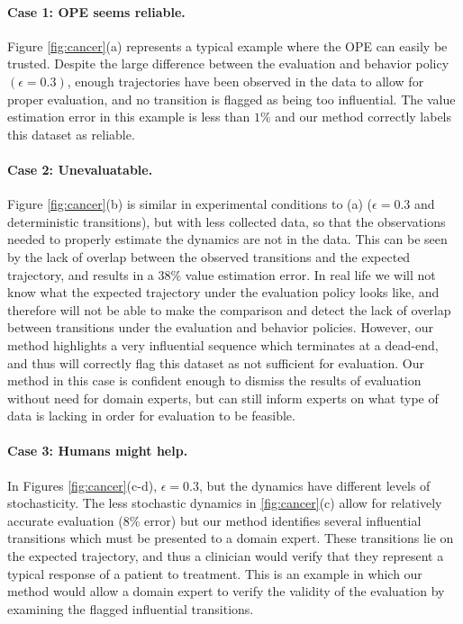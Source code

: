 \documentclass{article}
\begin{document}
\paragraph{Case 1: OPE seems reliable.}
Figure \ref{fig:cancer}(a) represents a typical example where the OPE can easily be trusted. Despite the large difference between the evaluation and behavior policy $(\epsilon = 0.3)$, enough trajectories have been observed in the data to allow for proper evaluation, and no transition is flagged as being too influential. The value estimation error in this example is less than $1\%$ and our method correctly labels this dataset as reliable.

\paragraph{Case 2: Unevaluatable.}
Figure \ref{fig:cancer}(b) is similar in experimental conditions to (a) ($\epsilon = 0.3$ and deterministic transitions), but with less collected data, so that the observations needed to properly estimate the dynamics are not in the data. This can be seen by the lack of overlap between the observed transitions and the expected trajectory, and results in a $38\%$ value estimation error. In real life we will not know what the expected trajectory under the evaluation policy looks like, and therefore will not be able to make the comparison and detect the lack of overlap between transitions under the evaluation and behavior policies. However, our method highlights a very influential sequence which terminates at a dead-end, and thus will correctly flag this dataset as not sufficient for evaluation. Our method in this case is confident enough to dismiss the results of evaluation without need for domain experts, but can still inform experts on what type of data is lacking in order for evaluation to be feasible.

\paragraph{Case 3: Humans might help.}
In Figures \ref{fig:cancer}(c-d), $\epsilon = 0.3$, but the dynamics have different levels of stochasticity. The less stochastic dynamics in \ref{fig:cancer}(c) allow for relatively accurate evaluation ($8\%$ error) but our method identifies several influential transitions which must be presented to a domain expert. These transitions lie on the expected trajectory, and thus a clinician would verify that they represent a typical response of a patient to treatment. This is an example in which our method would allow a domain expert to verify the validity of the evaluation by examining the flagged influential transitions.
\end{document}
